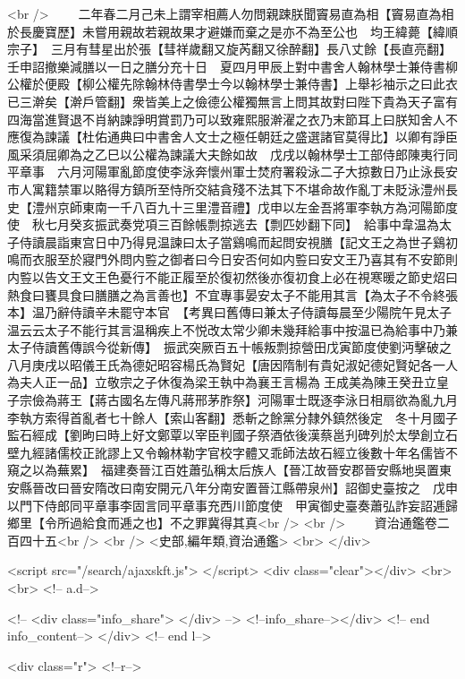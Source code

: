 <br />
　　二年春二月己未上謂宰相薦人勿問親踈朕聞竇易直為相【竇易直為相於長慶寶歷】未嘗用親故若親故果才避嫌而棄之是亦不為至公也　均王緯薨【緯順宗子】　三月有彗星出於張【彗祥歲翻又旋芮翻又徐醉翻】長八丈餘【長直亮翻】壬申詔撤樂減膳以一日之膳分充十日　夏四月甲辰上對中書舍人翰林學士兼侍書柳公權於便殿【柳公權先除翰林侍書學士今以翰林學士兼侍書】上舉衫袖示之曰此衣已三澣矣【澣戶管翻】衆皆美上之儉德公權獨無言上問其故對曰陛下貴為天子富有四海當進賢退不肖納諫諍明賞罰乃可以致雍熙服澣濯之衣乃末節耳上曰朕知舍人不應復為諫議【杜佑通典曰中書舍人文士之極任朝廷之盛選諸官莫得比】以卿有諍臣風采須屈卿為之乙巳以公權為諫議大夫餘如故　戊戌以翰林學士工部侍郎陳夷行同平章事　六月河陽軍亂節度使李泳奔懷州軍士焚府署殺泳二子大掠數日乃止泳長安市人寓籍禁軍以賂得方鎮所至恃所交結貪殘不法其下不堪命故作亂丁未貶泳澧州長史【澧州京師東南一千八百九十三里澧音禮】戊申以左金吾將軍李執方為河陽節度使　秋七月癸亥振武奏党項三百餘帳剽掠逃去【剽匹妙翻下同】　給事中韋温為太子侍讀晨詣東宫日中乃得見温諫曰太子當鷄鳴而起問安視膳【記文王之為世子鷄初鳴而衣服至於寢門外問内䜿之御者曰今日安否何如内䜿曰安文王乃喜其有不安節則内䜿以告文王文王色憂行不能正履至於復初然後亦復初食上必在視寒暖之節史炤曰熱食曰饔具食曰膳膳之為言善也】不宜專事晏安太子不能用其言【為太子不令終張本】温乃辭侍讀辛未罷守本官　【考異曰舊傳曰兼太子侍讀每晨至少陽院午見太子温云云太子不能行其言温稱疾上不悦改太常少卿未幾拜給事中按温已為給事中乃兼太子侍讀舊傳誤今從新傳】　振武突厥百五十帳叛剽掠營田戊寅節度使劉沔擊破之　八月庚戌以昭儀王氏為德妃昭容楊氏為賢妃【唐因隋制有貴妃淑妃德妃賢妃各一人為夫人正一品】立敬宗之子休復為梁王執中為襄王言楊為王成美為陳王癸丑立皇子宗儉為蔣王【蔣古國名左傳凡蔣邢茅胙祭】河陽軍士既逐李泳日相扇欲為亂九月李執方索得首亂者七十餘人【索山客翻】悉斬之餘黨分隸外鎮然後定　冬十月國子監石經成【劉昫曰時上好文鄭覃以宰臣判國子祭酒依後漢蔡邕刋碑列於太學創立石壁九經諸儒校正訛謬上又令翰林勒字官校字體又乖師法故石經立後數十年名儒皆不窺之以為蕪累】　福建奏晉江百姓蕭弘稱太后族人【晉冮故晉安郡晉安縣地吳置東安縣晉改曰晉安隋改曰南安開元八年分南安置晉江縣帶泉州】詔御史臺按之　戊申以門下侍郎同平章事李固言同平章事充西川節度使　甲寅御史臺奏蕭弘詐妄詔逓歸鄉里【令所過給食而逓之也】不之罪冀得其真<br />
<br />
　　資治通鑑卷二百四十五<br />
<br />
<史部,編年類,資治通鑑>  <br>
   </div> 

<script src="/search/ajaxskft.js"> </script>
 <div class="clear"></div>
<br>
<br>
 <!-- a.d-->

 <!--
<div class="info_share">
</div> 
-->
 <!--info_share--></div>   <!-- end info_content-->
  </div> <!-- end l-->

<div class="r">   <!--r-->



